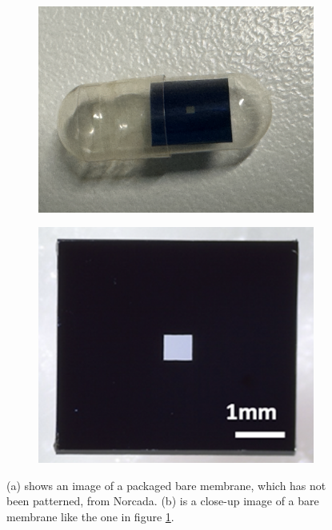 \begin{figure}[h!]
    \centering
    \begin{subfigure}[b]{0.35\textwidth}
        \includegraphics[width=\textwidth]{figures/packaged_membrane_picture.png}
        \caption{}
        \label{fig:packaged_membrane}
    \end{subfigure}
    \hspace{1cm}
    \begin{subfigure}[b]{0.35\textwidth}
        \includegraphics[width=\textwidth]{figures/membrane_picture.png}
        \caption{}
        \label{fig:membrane_closeup}
    \end{subfigure}
    \caption{(a) shows an image of a packaged bare membrane, which has not been patterned, from Norcada. (b) is a close-up image of a bare membrane like the one in figure \ref{fig:packaged_membrane}.}
    \label{fig:membrane_pictures}
\end{figure}

